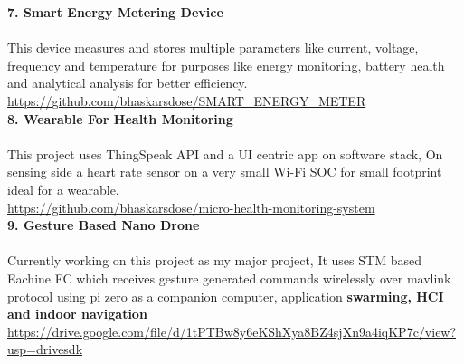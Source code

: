 \documentclass[10pt]{report}
\begin{document}
\noindent\textbf{\large 7. Smart Energy Metering Device\\[1pt]}
\\This device measures and stores multiple parameters like current, voltage, frequency and temperature for purposes like energy monitoring, battery health and analytical analysis for better efficiency. 
\\\faExternalLink\hspace{1pt} \url{https://github.com/bhaskarsdose/SMART\_ENERGY\_METER}
\\[2pt]

\noindent\textbf{\large 8. Wearable For Health Monitoring \\[1pt]}
\\This project uses ThingSpeak API and a UI centric app on software stack, On sensing side a heart rate sensor on a very small Wi-Fi SOC for small footprint ideal for a wearable.
\\\faExternalLink\hspace{1pt} \url{https://github.com/bhaskarsdose/micro-health-monitoring-system}
\\[2pt]


\noindent\textbf{\large 9. Gesture Based Nano Drone\\[1pt]}
\\Currently working on this project as my major project, It uses STM based Eachine FC which receives gesture generated commands wirelessly over mavlink protocol using pi zero as a companion computer, application  \textbf{swarming, HCI and indoor navigation} 
\\\faExternalLink\hspace{1pt} \url{https://drive.google.com/file/d/1tPTBw8y6eKShXya8BZ4sjXn9a4iqKP7c/view?usp=drivesdk}
\\[1pt]

  
\end{document}
